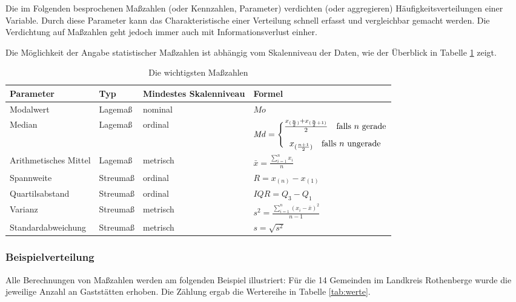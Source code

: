 \documentclass[
  ngerman,
]{article}
\begin{document}
Die im Folgenden besprochenen Maßzahlen (oder Kennzahlen, Parameter) verdichten (oder aggregieren) Häufigkeitsverteilungen einer Variable. Durch diese Parameter kann das Charakteristische einer Verteilung schnell erfasst und vergleichbar gemacht werden. Die Verdichtung auf Maßzahlen geht jedoch immer auch mit Informationsverlust einher.

Die Möglichkeit der Angabe statistischer Maßzahlen ist abhängig vom Skalenniveau der Daten, wie der Überblick in Tabelle \ref{tab:mass} zeigt.

\begin{table}[!h]

\caption{\label{tab:mass}Die wichtigsten Maßzahlen}
\centering
\begin{tabular}[t]{llll}
\toprule
Parameter & Typ & Mindestes Skalenniveau & Formel\\
\midrule
Modalwert & Lagemaß & nominal & \medskip$\mathit{Mo}$\\
Median & Lagemaß & ordinal & \medskip$\def\arraystretch{1.2} \mathit{Md} = \Bigg\{\begin{array}{@{}c@{}}\frac{x_{(\frac{n}{2})}+x_{(\frac{n}{2}+1)}}{2} \quad \textrm{falls }n \textrm{ gerade}\\[6pt] x_{(\frac{n+1}{2})}\quad \textrm{falls }n \textrm{ ungerade}\end{array}$\\
Arithmetisches Mittel & Lagemaß & metrisch & \medskip$\bar{x}=\frac{\sum\limits_{i=1}^{n}x _{i}}{n}$\\
Spannweite & Streumaß & ordinal & \medskip$R=x_{(n)}-x_{(1)}$\\
Quartilsabstand & Streumaß & ordinal & \medskip$\mathit{IQR}=Q_3-Q_1$\\
\addlinespace
Varianz & Streumaß & metrisch & \medskip$s^2=\frac{\sum\limits_{i=1}^{n}(x_{i}-\bar{x})^2}{n-1}$\\
Standardabweichung & Streumaß & metrisch & \medskip$s=\sqrt{s^2}$\\
\bottomrule
\end{tabular}
\end{table}

\hypertarget{beispielverteilung}{%
\subsubsection{Beispielverteilung}\label{beispielverteilung}}

Alle Berechnungen von Maßzahlen werden am folgenden Beispiel illustriert: Für die 14 Gemeinden im Landkreis Rothenberge wurde die jeweilige Anzahl an Gaststätten erhoben. Die Zählung ergab die Wertereihe in Tabelle \ref{tab:werte}.
\end{document}
